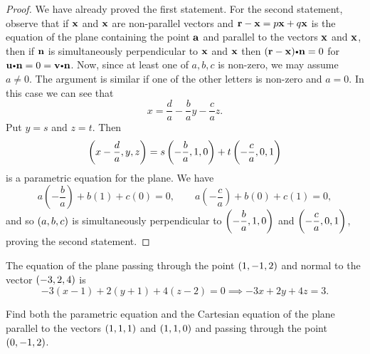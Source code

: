 \begin{proof}We have already proved the first statement. For the second
statement, observe that if  $\mathbf{ x}$ and $\mathbf{ x}$ are
non-parallel vectors and  $\mathbf{ r} - \mathbf{ x} = p\mathbf{ x} +
q\mathbf{ x}$ is the equation of the plane containing the point
${\mathbf a}$ and parallel to the vectors $\mathbf{ x}$ and
$\mathbf{ x}$, then if $\mathbf{ n}$ is simultaneously perpendicular
to $\mathbf{ x}$ and $\mathbf{ x}$ then $(\vector{r} - \vector{x})\bp
\vector{n} = 0$ for $\dotprod{u}{n} = 0 = \dotprod{v}{n}$. Now,
since  at least one of $a, b, c$ is non-zero, we may  assume $a \neq
0$. The argument is similar if one of the other letters is non-zero
and $a = 0$. In this case we can see that
$$ x =\dfrac{d}{a} -\dfrac{b}{a}y - \dfrac{c}{a}z.
$$ Put $y = s$ and $z = t$. Then
$$\left( x - \dfrac{d}{a}, y , z \right) = s\left( -\dfrac{b}{a} , 1 , 0 \right) + t\left( -\dfrac{c}{a} , 0 , 1 \right)   $$
is a parametric equation for the plane.  We have $$
a\left(-\dfrac{b}{a}\right) +b   \left(1\right) +c \left(0\right)
=0, \qquad a \left(-\dfrac{c}{a}\right) +b \left(0\right) +c
\left(1\right) =0,
$$and so $\left( a, b , c \right)$ is simultaneously perpendicular to $\left( -\dfrac{b}{a} , 1 , 0 \right)$
and $\left( -\dfrac{c}{a} , 0 , 1 \right) $, proving the second
statement.\end{proof}

\begin{exa}
The equation of the plane passing through the point $\left( 1,
-1, 2 \right)$ and normal to the vector  $\displaystyle{\left( -3,  2, 4 \right)}$ is
$$-3(x - 1) + 2(y + 1) + 4(z - 2) = 0 \implies -3x+2y+4z=3.$$
\end{exa}


\begin{exa}\label{exa:eqn_of_plane1}
Find both the parametric equation and the Cartesian equation of the
plane parallel to the vectors $\left( 1
, 1 , 1 \right)$ and $\left( 1 , 1, 0 \right)$ and passing through the
point $\left( 0 , -1, 2 \right)$.
\end{exa}


